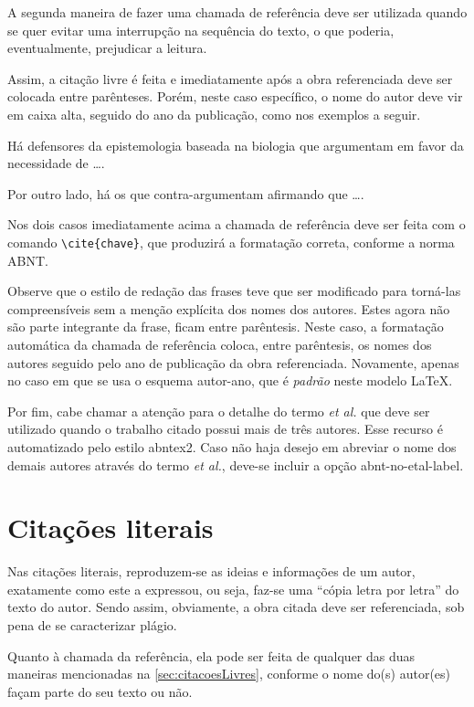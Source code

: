 \begin{apendicesenv}
A segunda maneira de fazer uma chamada de referência deve ser utilizada quando se quer evitar uma interrupção na sequência do texto, o que poderia, eventualmente, prejudicar a leitura.

Assim, a citação livre é feita e imediatamente após a obra referenciada deve ser colocada entre parênteses. Porém, neste caso específico, o nome do autor deve vir em caixa alta, seguido do ano da publicação, como nos exemplos a seguir.

Há defensores da epistemologia baseada na biologia que argumentam em favor da necessidade de \ldots \cite{Maturana2003}.

Por outro lado, há os que contra-argumentam afirmando que \ldots  \cite{Barbosa2004}.

Nos dois casos imediatamente acima a chamada de referência deve ser feita com o comando \verb|\cite{chave}|, que produzirá a formatação correta, conforme a norma ABNT.

Observe que o estilo de redação das frases teve que ser modificado para torná-las compreensíveis sem a menção explícita dos nomes dos autores. Estes agora não são parte integrante da frase, ficam entre parêntesis. Neste caso, a formatação automática da chamada de referência coloca, entre parêntesis, os nomes dos autores seguido pelo ano de publicação da obra referenciada. Novamente, apenas no caso em que se usa o esquema autor-ano, que é \textit{padrão} neste modelo \LaTeX{}.

Por fim, cabe chamar a atenção para o detalhe do termo \textit{et al.} que deve ser utilizado quando o trabalho citado possui mais de três autores. Esse recurso é automatizado pelo estilo {\ttfamily abntex2}. Caso não haja desejo em abreviar o nome dos demais autores através do termo \textit{et al.}, deve-se incluir a opção {\ttfamily abnt-no-etal-label}.



\section{Citações literais}
\label{sec:citacoesLiterais}

Nas citações literais, reproduzem-se as ideias e informações de um autor, exatamente como este a expressou, ou seja, faz-se uma ``cópia letra por letra'' do texto do autor. Sendo assim, obviamente, a obra citada deve ser referenciada, sob pena de se caracterizar plágio.

Quanto à chamada da referência, ela pode ser feita de qualquer das duas maneiras mencionadas na \autoref{sec:citacoesLivres}, conforme o nome do(s) autor(es) façam parte do seu texto ou não.


\end{apendicesenv}
